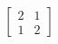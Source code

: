 \documentclass[preview]{standalone}
\begin{document}
\begin{align*}
\begin{bmatrix} 2 & 1 \\ 1 & 2 \end{bmatrix}
\end{align*}
\end{document}

